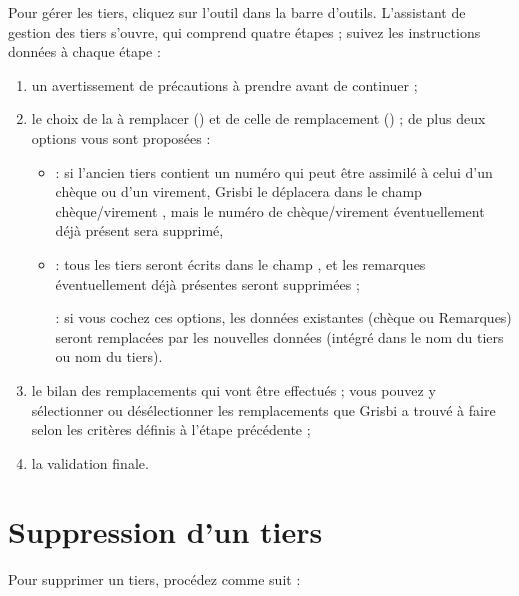 Pour gérer les tiers, cliquez sur l'outil  dans la barre d'outils. L'assistant de gestion des tiers s'ouvre, qui comprend quatre étapes ; suivez les instructions données à chaque étape :
\begin{enumerate}
	 \item un avertissement de précautions à prendre avant de continuer ;
	 \item le choix de la  à remplacer () et de celle de remplacement () ; de plus deux options vous sont proposées :
		\begin{itemize}
			 \item {} : si l'ancien tiers contient un numéro qui peut être assimilé à celui d'un chèque ou d'un virement, Grisbi le déplacera dans le champ \og \No chèque/virement \fg{}, mais le numéro de chèque/virement éventuellement déjà présent sera supprimé,
			\item {} : tous les tiers seront écrits dans le champ , et les remarques éventuellement déjà présentes seront supprimées ;
			
			 : si vous cochez ces options, les données existantes (\No chèque ou Remarques) seront remplacées par les nouvelles données (\No intégré dans le nom du tiers ou nom du tiers).
		\end{itemize}
	 \item le bilan des remplacements qui vont être effectués ; vous pouvez y 	sélectionner ou désélectionner les remplacements que Grisbi a trouvé à faire selon les critères définis à l'étape précédente ;
	 \item la validation finale.
\end{enumerate}

\ifIllustration
\newpage
\fi


\section{Suppression d'un tiers\label{thirdparties-delete}}


Pour supprimer un tiers, procédez comme suit :

